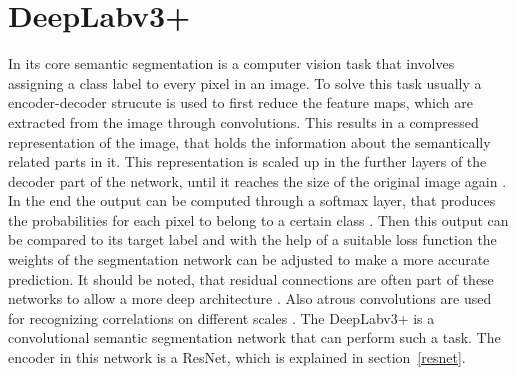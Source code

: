 \section{DeepLabv3+}
In its core semantic segmentation is a computer vision task that involves assigning a class label to every pixel in an image.
To solve this task usually a encoder-decoder strucute is used to first reduce the feature maps, which are extracted from the image through convolutions.
This results in a compressed representation of the image, that holds the information about the semantically related parts in it.
This representation is scaled up in the further layers of the decoder part of the network, until it reaches the size of the original image again \cite{Badrinarayanan2017}.\\
In the end the output can be computed through a softmax layer, that produces the probabilities for each pixel to belong to a certain class \cite{Badrinarayanan2017}.
Then this output can be compared to its target label and with the help of a suitable loss function the weights of the segmentation network can be adjusted to make a more accurate prediction.
It should be noted, that residual connections are often part of these networks to allow a more deep architecture \cite{Li2019}.
Also atrous convolutions are used for recognizing correlations on different scales \cite{Chen2017}.
The DeepLabv3+ is a convolutional semantic segmentation network that can perform such a task.
The encoder in this network is a ResNet, which is explained in section~\ref{resnet}.

